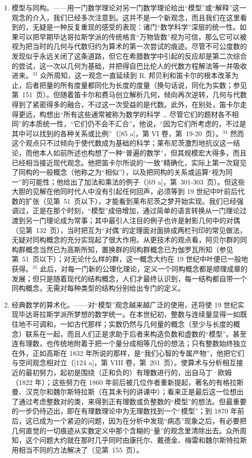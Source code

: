 \begin{enumerate}
\def\labelenumi{\Alph{enumi})}
\setcounter{enumi}{1}
\item
  模型与同构。——用一门数学理论对另一门数学理论给出“模型”或“解释”这一观念的介入，我们已经多次注意到。这并不是一个新观念，而且我们在这里看到的，无疑是一种反复重现的感受的表现：诸门“数学科学”深层的统一性。如果可以把早期毕达哥拉斯学派的传统格言“万物皆数”视为可信，那么它可以被视为把当时的几何与代数归约为算术的第一次尝试的痕迹。尽管不可公度数的发现似乎永远关闭了这条道路，但它在希腊数学中引起的反应却是第二次综合的尝试，这一次以几何为基础，并把得自巴比伦人的代数方程解法等一并吸收进来。\(^{33}\) 众所周知，这一观念一直延续到 R. 邦贝利和笛卡尔的根本改革为止，后者把量的所有度量都同化为长度的度量（换句话说，同化为实数；参见第~151~页）。但随着笛卡尔和费马创立解析几何，倾向再次逆转，几何与代数得到了紧密得多的融合，不过这一次受益的是代数。此外，在别处，笛卡尔走得更远，构想出“所有这些通常被称为数学的科学 \ldots{} 尽管它们的题材各不相同”的本质统一性，“它们仍不会不汇合”，他说，“因为它们所考虑的，不过是其中可以找到的各种关系或比例”（{[}85 a{]}，第 VI 卷，第~19-20~页）。\(^{34}\) 然而这个观点只不过倾向于使代数成为基础的科学；莱布尼茨激烈地抗议这一结论，而他本人如前所述也构想了一种“普遍的数学”，但其规模宏大得多，而且已经相当接近现代观念。他把笛卡尔所说的“一致”精确化，实际上第一次窥见了同构的一般概念（他称之为“相似”），以及把同构的关系或运算“视为同一”的可能性；他给出了加法和乘法的例子（{[}69 a{]}，第~301-303~页）。但这些大胆的见解在他同时代人中没有引起任何回声，必须等到 19 世纪中叶前后代数的扩张（见第~51~页以下），才能看到莱布尼茨之梦开始实现。我们已经强调过，正是在那个时刻，“模型”成倍增加，通过简单的语言转换从一门理论过渡到另一门理论成为常事；其中最引人注目的例子也许是射影几何中的对偶（见第~132~页），当时把互为“对偶”的定理面对面排成两栏刊印的常见做法，无疑对同构概念的充分实现起了很大作用。从更技术的观点看，阿贝尔群的同构群概念当然已为高斯所知，置换群的同构群概念已为伽罗瓦所知（参见第~51~页以下）；对无论什么样的群，这一概念大约在 19 世纪中叶便已一般地获得。\(^{35}\) 此后，对每一门新的公理化理论，定义一个同构概念都是顺理成章的发展；但只是随着现代的结构概念，人们才最终认识到，每一结构都自带一个同构概念，无需对每种类型的结构分别给出专门的定义。
\item
  经典数学的算术化。——对“模型”观念越来越广泛的使用，还将使 19 世纪实现毕达哥拉斯学派所梦想的数学统一。在本世纪初，整数与连续量显得一如既往地不可调和，一如古代那样；实数仍然与几何量的概念（至少与长度的概念）联系在一起，而且人们正是求助于后者来构造负数和虚数的“模型”。甚至连有理数，也传统地附着于把一个量分成相等几份的想法；只有整数始终独立在外，正如高斯在 1832 年所说的那样，是“我们心智的专属产物”，他把它们与空间观念相对立（{[}124 a{]}，第 VIII 卷，第~201~页）。使算术与分析相互接近的最初努力，起初是围绕（正和负的）有理数进行的，出自马丁·欧姆（1822 年）；这些努力在 1860 年前后被几位作者重新提起，著名的有格拉斯曼、汉克尔和魏尔斯特拉斯（在其未刊的讲课中）；看来正是最后这一位想出了通过考虑整数对的类，来得到正有理数或负整数的“模型”的想法。但最重要的一步仍待迈出，即在有理数理论中为无理数找到一个“模型”；到 1870 年前后，这已成为一个紧迫的问题，因为在分析中发现“病态”现象之后，有必要把几何直觉的一切痕迹从实数定义中那个含糊的“量”的观念里清除出去。众所周知，这个问题大约就在那时几乎同时由康托尔、戴德金、梅雷和魏尔斯特拉斯用相当不同的方法解决了（见第~155~页）。

\end{enumerate}
